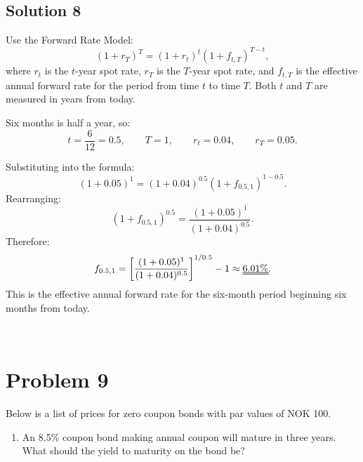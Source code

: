 \documentclass[12]{article}
\begin{document}
\color{blue}
\subsection*{Solution 8} 
\noindent Use the Forward Rate Model:
\[
(1+r_T)^T=(1+r_t)^t(1+f_{t,T})^{T-t},
\]
where $r_t$ is the $t$-year spot rate, $r_T$ is the $T$-year spot rate, and $f_{t,T}$ is the effective annual forward rate for the period from time $t$ to time $T$. Both $t$ and $T$ are measured in years from today.

\par\noindent Six months is half a year, so:
\[
t=\frac{6}{12}=0.5,
\qquad
T=1,
\qquad
r_t=0.04,
\qquad
r_T=0.05.
\]

\par\noindent Substituting into the formula:
\[
(1+0.05)^1=(1+0.04)^{0.5}(1+f_{0.5,1})^{1-0.5}.
\]
Rearranging:
\[
(1+f_{0.5,1})^{0.5}
=\frac{(1+0.05)^1}{(1+0.04)^{0.5}}.
\]
Therefore:
\[
f_{0.5,1}
=\left[\frac{(1+0.05)^1}{(1+0.04)^{0.5}}\right]^{1/0.5}-1
\approx\text{\uuline{6.01\%}}.
\]
\noindent This is the effective annual forward rate for the six-month period beginning six months from today.



\noindent
\\
\color{black}
\color{black}
\section*{Problem 9}
Below is a list of prices for zero coupon bonds with par values of NOK 100.
\begin{table}[H]
\centering
{}
\label{tab:my-table}
\end{table}

\begin{enumerate}
    \item[a)] An 8.5\% coupon bond making annual coupon will mature in three years. What should the yield to maturity on the bond be?
\end{enumerate}
\end{document}
